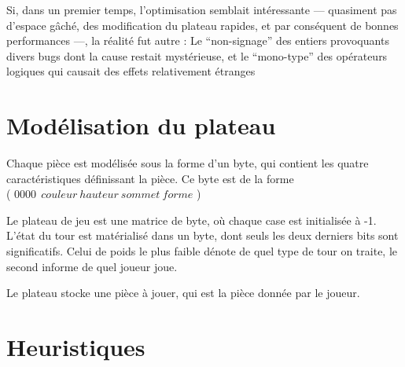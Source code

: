 \documentclass{article}
\begin{document}
Si, dans un premier temps, l'optimisation semblait intéressante ---
quasiment pas d'espace gâché, des modification du plateau rapides, et
par conséquent de bonnes performances ---, la réalité fut autre :
Le ``non-signage'' des entiers provoquants divers bugs dont la cause
restait mystérieuse, et le ``mono-type'' des opérateurs logiques qui
causait des effets relativement étranges



\section{Modélisation du plateau}
Chaque pièce est modélisée sous la forme d'un byte, qui contient les
quatre caractéristiques définissant la pièce. Ce byte est de la forme 
\\ ( \( 0000~~couleur~hauteur~sommet~forme \) ) 


Le plateau de jeu est une matrice de byte, o\`u chaque case est
initialisée à -1.
L'état du tour est matérialisé dans un byte, dont seuls les deux
derniers bits sont significatifs. Celui de poids le plus faible dénote de quel
type de tour on traite, le second informe de quel joueur joue.


Le plateau stocke une pièce à jouer, qui est la pièce donnée par le
joueur.

\section{Heuristiques}
\end{document}
